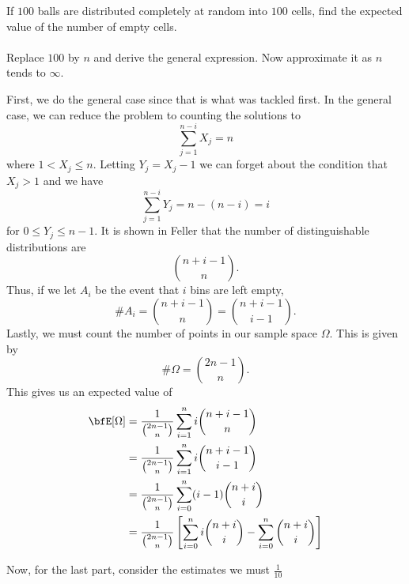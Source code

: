 \begin{problem}[Handout 1, \# 20]
  If \(100\) balls are distributed completely at random into \(100\) cells,
  find the expected value of the number of empty cells.
  \\\\
  Replace \(100\) by \(n\) and derive the general expression. Now
  approximate it as \(n\) tends to \(\infty\).
\end{problem}
\begin{solution}
  First, we do the general case since that is what was tackled first. In
  the general case, we can reduce the problem to counting the solutions to
  \[
    \sum_{j=1}^{n-i}X_j=n
  \]
  where \(1<X_j\leq n\). Letting \(Y_j=X_j-1\) we can forget about the
  condition that \(X_j>1\) and we have
  \[
    \sum_{j=1}^{n-i}Y_j=n-(n-i)=i
  \]
  for \(0\leq Y_j\leq n-1\). It is shown in Feller that the number of
  distinguishable distributions are
  \[
    \binom{n+i-1}{n}.
  \]
  Thus, if we let \(A_i\) be the event that \(i\) bins are left empty,
  \[
    \# A_i=\binom{n+i-1}{n}
    =\binom{n+i-1}{i-1}.
  \]
  Lastly, we must count the number of points in our sample space
  \(\Omega\). This is given by
  \[
    \#\Omega=%
    \binom{2n-1}{n}.
  \]
  This gives us an expected value of
  \begin{align*}
    \bfE[\Omega]
    &=\frac{1}{\binom{2n-1}{n}}\sum_{i=1}^ni\binom{n+i-1}{n}\\
    &=\frac{1}{\binom{2n-1}{n}}\sum_{i=1}^ni\binom{n+i-1}{i-1}\\
    &=\frac{1}{\binom{2n-1}{n}}\sum_{i=0}^n(i-1)\binom{n+i}{i}\\
    &=\frac{1}{\binom{2n-1}{n}}
      \left[\sum_{i=0}^ni\binom{n+i}{i}-\sum_{i=0}^n\binom{n+i}{i}\right]\\
  \end{align*}

  Now, for the last part, consider the estimates we must \(\frac{1}{10}\)
\end{solution}

